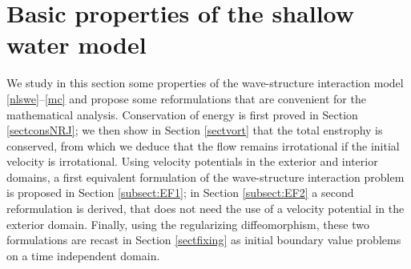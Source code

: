 \section{Basic properties of the shallow water model}\label{sect:BP}
We study in this section some properties of the wave-structure interaction model \eqref{nlswe}--\eqref{mc} and
propose some reformulations that are convenient for the mathematical analysis.
Conservation of energy is first proved in Section \ref{sectconsNRJ};
we then show in Section \ref{sectvort} that the total enstrophy is conserved,
from which we deduce that the flow remains irrotational if the initial velocity is irrotational.
Using velocity potentials in the exterior and interior domains,
a first equivalent formulation of the wave-structure interaction problem is proposed in Section \ref{subsect:EF1};
in Section \ref{subsect:EF2} a second reformulation is derived, that does not need the use of a velocity potential in the exterior domain.
Finally, using the regularizing diffeomorphism, these two formulations are recast in Section \ref{sectfixing}
as initial boundary value problems on a time independent domain.

